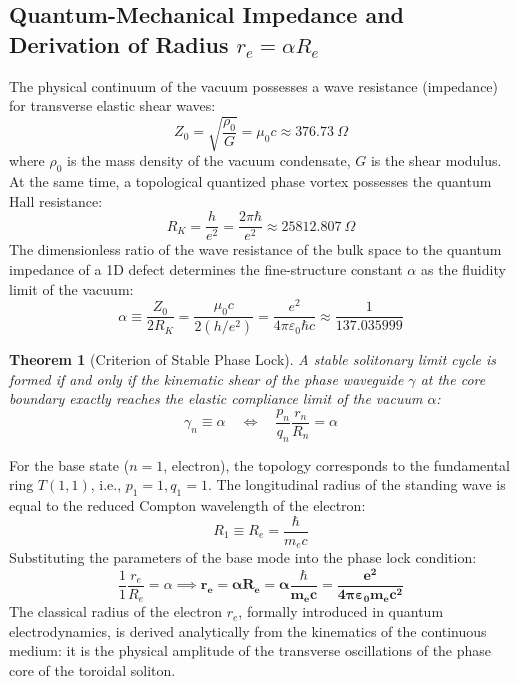 \documentclass[12pt,a4paper]{article}
\newtheorem{theorem}{Theorem}
\begin{document}
	\subsection{Quantum-Mechanical Impedance and Derivation of Radius $r_e = \alpha R_e$}
	The physical continuum of the vacuum possesses a wave resistance (impedance) for transverse elastic shear waves:
	\begin{equation}
		Z_0 = \sqrt{\frac{\rho_0}{G}} = \mu_0 c \approx 376.73 \ \Omega
	\end{equation}
	where $\rho_0$ is the mass density of the vacuum condensate, $G$ is the shear modulus.
	At the same time, a topological quantized phase vortex possesses the quantum Hall resistance:
	\begin{equation}
		R_K = \frac{h}{e^2} = \frac{2\pi \hbar}{e^2} \approx 25812.807 \ \Omega
	\end{equation}
	The dimensionless ratio of the wave resistance of the bulk space to the quantum impedance of a 1D defect determines the fine-structure constant $\alpha$ as the fluidity limit of the vacuum:
	\begin{equation}
		\alpha \equiv \frac{Z_0}{2 R_K} = \frac{\mu_0 c}{2 (h/e^2)} = \frac{e^2}{4\pi \varepsilon_0 \hbar c} \approx \frac{1}{137.035999}
	\end{equation}
	
	\begin{theorem}[Criterion of Stable Phase Lock]
		A stable solitonary limit cycle is formed if and only if the kinematic shear of the phase waveguide $\gamma$ at the core boundary exactly reaches the elastic compliance limit of the vacuum $\alpha$:
		\begin{equation}
			\gamma_n \equiv \alpha \quad \Longleftrightarrow \quad \frac{p_n}{q_n} \frac{r_n}{R_n} = \alpha
		\end{equation}
	\end{theorem}
	
	For the base state ($n=1$, electron), the topology corresponds to the fundamental ring $T(1,1)$, i.e., $p_1 = 1, q_1 = 1$. The longitudinal radius of the standing wave is equal to the reduced Compton wavelength of the electron:
	\begin{equation}
		R_1 \equiv R_e = \frac{\hbar}{m_e c}
	\end{equation}
	Substituting the parameters of the base mode into the phase lock condition:
	\begin{equation}
		\frac{1}{1} \frac{r_e}{R_e} = \alpha \implies \mathbf{r_e = \alpha R_e = \alpha \frac{\hbar}{m_e c} = \frac{e^2}{4\pi\varepsilon_0 m_e c^2}}
	\end{equation}
	The classical radius of the electron $r_e$, formally introduced in quantum electrodynamics, is derived analytically from the kinematics of the continuous medium: it is the physical amplitude of the transverse oscillations of the phase core of the toroidal soliton.
	
\end{document}
